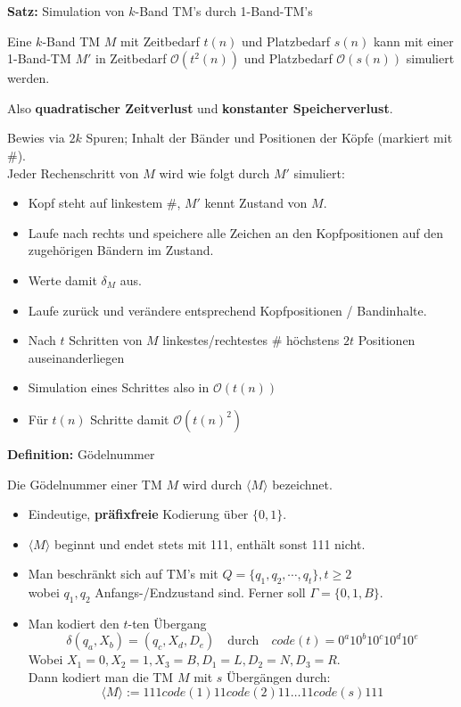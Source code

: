 \documentclass[a4paper,graphics,11pt]{article}
\newcommand{\godel}[1]{\langle #1 \rangle}
\begin{document}
\strut

\textbf{Satz:} Simulation von $k$-Band TM's durch 1-Band-TM's

Eine $k$-Band TM $M$ mit Zeitbedarf $t(n)$ und Platzbedarf $s(n)$ kann mit einer 1-Band-TM $M'$
in Zeitbedarf $\mathcal{O}(t^2(n))$ und Platzbedarf $\mathcal{O}(s(n))$ simuliert werden.

Also \textbf{quadratischer Zeitverlust} und \textbf{konstanter Speicherverlust}.

Bewies via $2k$ Spuren; Inhalt der Bänder und Positionen der Köpfe (markiert mit \#).\\
Jeder Rechenschritt von $M$ wird wie folgt durch $M'$ simuliert:
\begin{itemize}
    \item Kopf steht auf linkestem \#, $M'$ kennt Zustand von $M$.
    \item Laufe nach rechts und speichere alle Zeichen an den Kopfpositionen auf den
        zugehörigen Bändern im Zustand.
    \item Werte damit $\delta_M$ aus.
    \item Laufe zurück und verändere entsprechend Kopfpositionen / Bandinhalte.
    \\
    \item Nach $t$ Schritten von $M$ linkestes/rechtestes \# höchstens $2t$ Positionen auseinanderliegen
    \item Simulation eines Schrittes also in $\mathcal{O}(t(n))$
    \item Für $t(n)$ Schritte damit $\mathcal{O}(t(n)^2)$
\end{itemize}

\newpage

\textbf{Definition:} Gödelnummer

Die Gödelnummer einer TM $M$ wird durch $\langle M \rangle$ bezeichnet.

\begin{itemize}
    \item Eindeutige, \textbf{präfixfreie} Kodierung über $\{0,1\}$.
    \item $\langle M \rangle$ beginnt und endet stets mit 111, enthält sonst 111 nicht.
    \item Man beschränkt sich auf TM's mit $Q= \{q_1,q_2,\cdots,q_t\}, t \geq 2$\\
        wobei $q_1,q_2$ Anfangs-/Endzustand sind. Ferner soll $\Gamma = \{0,1,B\}$.

    \item Man kodiert den $t$-ten Übergang
        $$
            \delta(q_a,X_b) = (q_c, X_d, D_e)
            \quad\text{durch}\quad
            code(t) = 0^a10^b10^c10^d10^e
        $$
        Wobei $X_1 = 0, X_2 = 1, X_3 = B, D_1 = L, D_2 = N, D_3 = R$.\\

        Dann kodiert man die TM $M$ mit $s$ Übergängen durch:
        $$
            \godel{M} := 111code(1)11code(2)11\dots 11code(s)111
        $$
\end{itemize}
\end{document}
